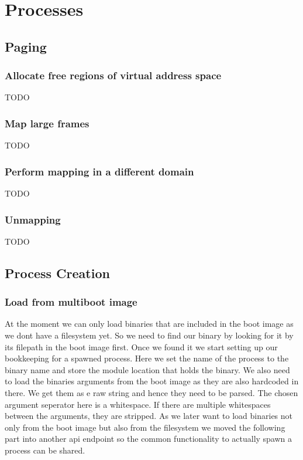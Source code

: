 \chapter{Processes}

\section{Paging}

\subsection{Allocate free regions of virtual address space}
TODO

\subsection{Map large frames}
TODO

\subsection{Perform mapping in a different domain}
TODO

\subsection{Unmapping}
TODO

\section{Process Creation}

\subsection{Load from multiboot image}

At the moment we can only load binaries that are included in the boot image as
we dont have a filesystem yet. So we need to find our binary by looking for it
by its filepath in the boot image first.  Once we found it we start setting up
our bookkeeping for a spawned process. Here we set the name of the process to
the binary name and store the module location that holds the binary.  We also
need to load the binaries arguments from the boot image as they are also
hardcoded in there. We get them as e raw string and hence they need to be
parsed. The chosen argument seperator here is a whitespace. If there are
multiple whitespaces between the arguments, they are stripped.  As we later want
to load binaries not only from the boot image but also from the filesystem we
moved the following part into another api endpoint so the common functionality
to actually spawn a process can be shared.

